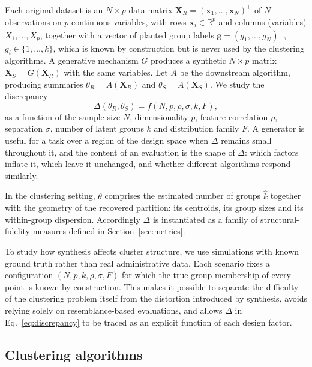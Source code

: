 \documentclass[pdflatex,referee]{sn-jnl}
\newcommand{\bx}{\mathbf{x}}
\newcommand{\bX}{\mathbf{X}}
\newcommand{\bg}{\mathbf{g}}
\begin{document}
Each original dataset is an $N \times p$ data matrix
$\bX_R = (\bx_1,\dots,\bx_N)^{\top}$ of $N$ observations on $p$ continuous
variables, with rows $\bx_i \in \mathbb{R}^p$ and columns (variables)
$X_1,\dots,X_p$, together with a vector of planted group labels
$\bg = (g_1,\dots,g_N)^{\top}$, $g_i \in \{1,\dots,k\}$, which is known by
construction but is never used by the clustering algorithms. A generative
mechanism $G$ produces a synthetic $N \times p$ matrix $\bX_S = G(\bX_R)$ with
the same variables. Let $A$ be the downstream algorithm, producing summaries
$\theta_R = A(\bX_R)$ and $\theta_S = A(\bX_S)$. We study the discrepancy
\begin{equation}
  \Delta(\theta_R, \theta_S) = f(N, p, \rho, \sigma, k, F),
  \label{eq:discrepancy}
\end{equation}
as a function of the sample size $N$, dimensionality $p$, feature
correlation $\rho$, separation $\sigma$, number of latent groups $k$ and
distribution family $F$. A generator is useful for a task over a region of the
design space when $\Delta$ remains small throughout it, and the content of an
evaluation is the shape of $\Delta$: which factors inflate it, which leave it
unchanged, and whether different algorithms respond similarly.

In the clustering setting, $\theta$ comprises the estimated number of groups
$\hat{k}$ together with the geometry of the recovered partition: its
centroids, its group sizes and its within-group dispersion. Accordingly
$\Delta$ is instantiated as a family of structural-fidelity measures defined in
Section~\ref{sec:metrics}.

To study how synthesis affects cluster structure, we use simulations with
known ground truth rather than real administrative data. Each scenario fixes a
configuration $(N, p, k, \rho, \sigma, F)$ for which the true group membership
of every point is known by construction. This makes it possible to separate the
difficulty of the clustering problem itself from the distortion introduced by
synthesis, avoids relying solely on resemblance-based evaluations, and allows
$\Delta$ in Eq.~\eqref{eq:discrepancy} to be traced as an explicit function of
each design factor.

\subsection{Clustering algorithms}
\label{sec:algorithms}
\end{document}
